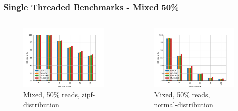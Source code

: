 \documentclass[
	aspectratio=169,
	compress,
]{beamer}
\newcommand{\navframetitle}[1]{\frametitle{#1\hfill{\footnotesize\lastsection{}}}}
\begin{document}

\begin{frame}[fragile]
	\navframetitle{Single Threaded Benchmarks - Mixed 50\%}

	\begin{columns}
		\begin{column}{0.5\textwidth}
			\begin{figure}
        		\includegraphics[width=\textwidth]{rw_50to50_zipf.jpg}
        		\caption{Mixed, 50\% reads, zipf-distribution}
			\end{figure}
		\end{column}
		\begin{column}{0.5\textwidth}
			\begin{figure}[ht]
    			\centering
    			\includegraphics[width=\textwidth]{rw_50to50_normal.jpg}
        		\caption{Mixed, 50\% reads, normal-distribution}
			\end{figure}			
		\end{column}
	\end{columns}
\end{frame}
\end{document}
